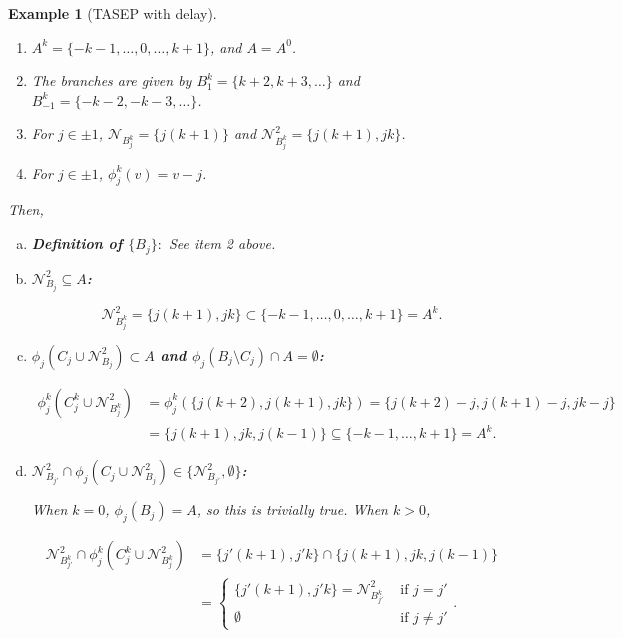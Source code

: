 \documentclass[12pt]{article}
\newcommand{\mc}{\mathcal}
\newcommand{\te}{\text}
\newcommand{\neigh}[1]{\mc{N}_{#1}}				%
\newcommand{\dneigh}[1]{\mc{N}^2_{#1}}			%
\newcommand{\indx}[1]{^{#1}}						%
\newtheorem{example}[thms]{Example}
\begin{document}
\begin{example}[TASEP with delay]
\begin{description}
\begin{enumerate}
\item \(A\indx{k} = \{-k-1,\dots,0,\dots,k+1\}\), and \(A = A\indx{0}\).

\item The branches are given by \(B\indx{k}_1 = \{k+2,k+3,\dots\}\) and \(B\indx{k}_{-1} = \{-k-2,-k-3,\dots\}\).

\item For \(j\in \pm 1\), \(\neigh{B\indx{k}_j} = \{j(k+1)\}\) and \(\dneigh{B\indx{k}_j} = \{j(k+1),jk\}\).

\item For \(j \in \pm 1\), \(\phi\indx{k}_j(v) = v - j\).
\end{enumerate}

Then,

\begin{enumerate}[(a)]
\item {\bfseries\boldmath Definition of \(\{B_j\}:\)} See item 2 above.

\item {\bfseries\boldmath\(\dneigh{B_j}\subseteq A\):}

\[\dneigh{B\indx{k}_j} = \{j(k+1),jk\} \subset \{-k-1,\dots,0,\dots,k+1\} = A\indx{k}.\]

\item {\bfseries\boldmath \(\phi_j(C_j\cup\dneigh{B_j}) \subset A\) and \(\phi_j(B_j\setminus C_j) \cap A = \emptyset\):}

\begin{align*}
\phi\indx{k}_j(C\indx{k}_j\cup\dneigh{B\indx{k}_j}) &= \phi\indx{k}_j(\{j(k+2),j(k+1),jk\}) = \{j(k+2) - j,j(k+1)-j,jk-j\}\\
&= \{j(k+1),jk,j(k-1)\} \subseteq \{-k-1,\dots,k+1\} = A\indx{k}.
\end{align*}

\item {\bfseries\boldmath \(\dneigh{B_{j'}}\cap\phi_j(C_j\cup\dneigh{B_j}) \in \{\dneigh{B_{j'}},\emptyset\}\):}

When \(k = 0\), \(\phi_j(B_j) = A\), so this is trivially true. When \(k > 0\),

\begin{align*}
\dneigh{B\indx{k}_{j'}}\cap\phi\indx{k}_j(C\indx{k}_j\cup\dneigh{B\indx{k}_j}) &= \{j'(k+1),j'k\}\cap\{j(k+1),jk,j(k-1)\} \\
&= \begin{cases}
\{j'(k+1),j'k\} = \dneigh{B\indx{k}_{j'}}&\te{ if }j = j'\\
\emptyset &\te{ if } j \neq j'
\end{cases}.
\end{align*}


\end{enumerate}
\end{description}
\end{example}
\end{document}

